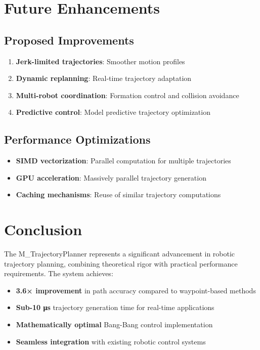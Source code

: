 \documentclass[12pt,a4paper]{article}
\begin{document}
\section{Future Enhancements}

\subsection{Proposed Improvements}

\begin{enumerate}
\item \textbf{Jerk-limited trajectories}: Smoother motion profiles
\item \textbf{Dynamic replanning}: Real-time trajectory adaptation
\item \textbf{Multi-robot coordination}: Formation control and collision avoidance
\item \textbf{Predictive control}: Model predictive trajectory optimization
\end{enumerate}

\subsection{Performance Optimizations}

\begin{itemize}
\item \textbf{SIMD vectorization}: Parallel computation for multiple trajectories
\item \textbf{GPU acceleration}: Massively parallel trajectory generation
\item \textbf{Caching mechanisms}: Reuse of similar trajectory computations
\end{itemize}

\section{Conclusion}

The M\_TrajectoryPlanner represents a significant advancement in robotic trajectory planning, combining theoretical rigor with practical performance requirements. The system achieves:

\begin{itemize}
\item \textbf{3.6× improvement} in path accuracy compared to waypoint-based methods
\item \textbf{Sub-10 μs} trajectory generation time for real-time applications
\item \textbf{Mathematically optimal} Bang-Bang control implementation
\item \textbf{Seamless integration} with existing robotic control systems
\end{itemize}
\end{document}
